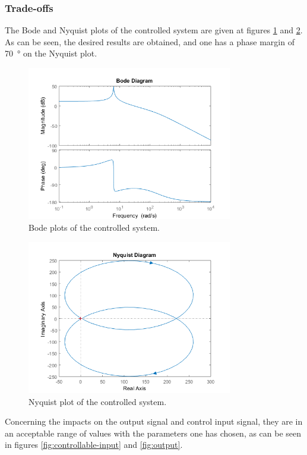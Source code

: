\subsubsection{Trade-offs}
The Bode and Nyquist plots of the controlled system are given at figures \ref{fig:bode-control} and \ref{fig:nyquist-control}. As can be seen, the desired results are obtained, and one has a phase margin of \SI{70}{\degree} on the Nyquist plot.
\begin{figure}[H]
    \centering
    \includegraphics[width=0.8\textwidth]{resources/png/bode-control.png}
    \caption{Bode plots of the controlled system.}
    \label{fig:bode-control}
\end{figure}
\begin{figure}[H]
    \centering
    \includegraphics[width=0.8\textwidth]{resources/png/nyquist-control.png}
    \caption{Nyquist plot of the controlled system.}
    \label{fig:nyquist-control}
\end{figure}
Concerning the impacts on the output signal and control input signal, they are in an acceptable range of values with the parameters one has chosen, as can be seen in figures \ref{fig:controllable-input} and \ref{fig:output}.
